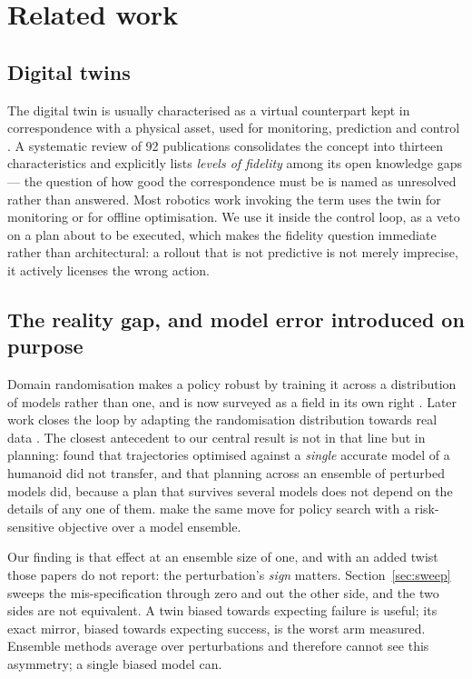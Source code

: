 \documentclass[11pt,a4paper]{article}
\begin{document}
\section{Related work}

\subsection{Digital twins}
The digital twin is usually characterised as a virtual counterpart kept in
correspondence with a physical asset, used for monitoring, prediction and
control \citep{grieves2017digital,tao2019digital}. A systematic review of 92
publications \citep{jones2020characterising} consolidates the concept into
thirteen characteristics and explicitly lists \emph{levels of fidelity} among its
open knowledge gaps --- the question of how good the correspondence must be is
named as unresolved rather than answered. Most robotics work invoking the term
uses the twin for monitoring or for offline optimisation. We use it inside the
control loop, as a veto on a plan about to be executed, which makes the fidelity
question immediate rather than architectural: a rollout that is not predictive
is not merely imprecise, it actively licenses the wrong action.

\subsection{The reality gap, and model error introduced on purpose}
Domain randomisation \citep{tobin2017domain,peng2018sim} makes a policy robust by
training it across a distribution of models rather than one, and is now
surveyed as a field in its own right \citep{muratore2022robot}. Later work closes
the loop by adapting the randomisation distribution towards real data
\citep{chebotar2019closing,ramos2019bayessim}. The closest antecedent to our
central result is not in that line but in planning: \citet{mordatch2015ensemble}
found that trajectories optimised against a \emph{single} accurate model of a
humanoid did not transfer, and that planning across an ensemble of perturbed
models did, because a plan that survives several models does not depend on the
details of any one of them. \citet{rajeswaran2017epopt} make the same move for
policy search with a risk-sensitive objective over a model ensemble.

Our finding is that effect at an ensemble size of one, and with an added twist
those papers do not report: the perturbation's \emph{sign} matters.
Section~\ref{sec:sweep} sweeps the mis-specification through zero and out the
other side, and the two sides are not equivalent. A twin biased towards
expecting failure is useful; its exact mirror, biased towards expecting success,
is the worst arm measured. Ensemble methods average over perturbations and
therefore cannot see this asymmetry; a single biased model can.
\end{document}
